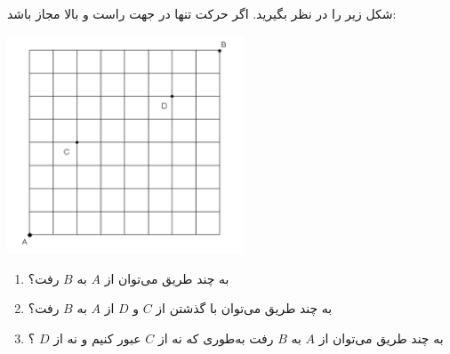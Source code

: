 \EXERCISE
شکل زیر را در نظر بگیرید. اگر حرکت تنها در جهت راست و بالا مجاز باشد:
\begin{center}
\includegraphics[height=6.5cm]{15.png}
\end{center}
\begin{enumerate}
\item
به چند طریق می‌توان از
$A$
به
$B$
رفت؟
\item
به چند طریق می‌توان با گذشتن از
$C$
و
$D$
از
$A$
به
$B$
رفت؟
\item
به چند طریق می‌توان از
$A$
به
$B$
رفت به‌طوری که نه از
$C$
عبور کنیم و نه از
$D$
؟
\end{enumerate}
